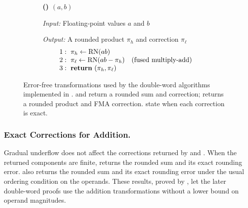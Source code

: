 \begin{figure}[t]
  \vspace{7pt}

  \begin{subfigure}[t]{\columnwidth}
    \label{alg:fast-two-mult}
    \colorbox{gray!3}{%
      \begin{minipage}[t]{\dimexpr\linewidth-2\fboxsep\relax}
        \centering
        \textbf{(\thesubfigure) \FastTwoMult{}$(a,b)$}
        \par\smallskip
        \raggedright\small
        \textit{Input:} Floating-point values $a$ and $b$\par
        \textit{Output:} A rounded product $\pi_h$ and correction $\pi_\ell$
        \setlength{\abovedisplayskip}{4pt}
        \setlength{\belowdisplayskip}{0pt}
        \[
          \begin{array}{@{}r@{\hspace{0.6em}}l@{}}
            1: & \pi_h \leftarrow \operatorname{RN}(ab)\\
            2: & \pi_\ell \leftarrow
                 \operatorname{RN}(ab-\pi_h)
                 \quad\text{(fused multiply-add)}\\
            3: & \mathbf{return}\ (\pi_h,\pi_\ell)
          \end{array}
        \]
      \end{minipage}}
  \end{subfigure}
  \endgroup
\caption{Error-free transformations used by the double-word algorithms
implemented in \FenceDD.
\TwoSum{} and \FastTwoSum{} return a rounded sum and correction;
\FastTwoMult{} returns a rounded product and FMA correction.
state when each correction is exact.}
  \label{fig:error-free-transformations}
\end{figure}

\subsubsection{Exact Corrections for Addition.}

Gradual underflow does not affect the corrections
returned by \TwoSum{} and \FastTwoSum{}. When the returned components are
finite, \TwoSum{} returns the rounded sum and its exact rounding error.
\FastTwoSum{} also returns the rounded sum and its exact rounding error
under the usual ordering condition on the operands. 
These results, proved by \citet{Boldo2017}, let the later
double-word proofs use the addition transformations without a
lower bound on operand magnitudes.


